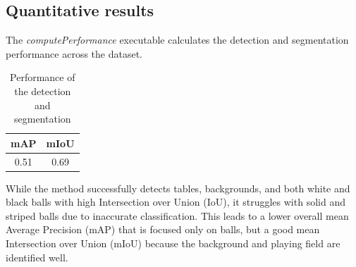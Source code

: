 \subsection{Quantitative results}
The \textit{computePerformance} executable calculates the detection and segmentation performance across the dataset.
\begin{table}
	\centering
    \begin{tabular}{|c|c|}
        \hline
        mAP & mIoU \\
        \hline
        0.51 & 0.69 \\
        \hline
    \end{tabular}
    \caption{Performance of the detection and segmentation}
    \label{tab: performance}
\end{table}
While the method successfully detects tables, backgrounds, and both white and black balls with high Intersection
over Union (IoU), it struggles with solid and striped balls due to inaccurate classification.
This leads to a lower overall mean Average Precision (mAP) that is focused only on balls,
but a good mean Intersection over Union (mIoU) because the background and playing field are identified well.

